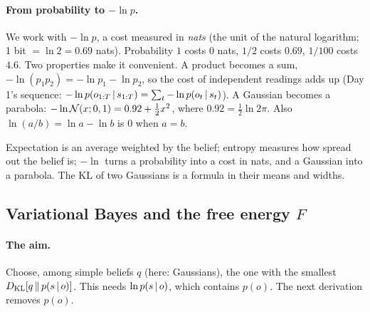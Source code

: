 \documentclass[11pt]{article}
\begin{document}
\paragraph{From probability to $-\ln p$.} We work with $-\ln p$, a cost measured in \emph{nats} (the unit of the natural logarithm; 1 bit $= \ln 2 = 0.69$ nats). Probability $1$ costs $0$ nats, $1/2$ costs $0.69$, $1/100$ costs $4.6$. Two properties make it convenient. A product becomes a sum, $-\ln(p_1p_2) = -\ln p_1 - \ln p_2$, so the cost of independent readings adds up (Day 1's sequence: $-\ln p(o_{1:T}\,|\, s_{1:T}) = \sum_t -\ln p(o_t\,|\, s_t)$). A Gaussian becomes a parabola: $-\ln\mathcal{N}(x;0,1) = 0.92 + \tfrac12x^2$, where $0.92 = \tfrac12\ln 2\pi$. Also $\ln(a/b) = \ln a - \ln b$ is $0$ when $a = b$.

\begin{keyidea}
Expectation is an average weighted by the belief; entropy measures how spread out the belief is; $-\ln$ turns a probability into a cost in nats, and a Gaussian into a parabola. The KL of two Gaussians is a formula in their means and widths.
\end{keyidea}

\subsection{Variational Bayes and the free energy $F$}

\paragraph{The aim.} Choose, among simple beliefs $q$ (here: Gaussians), the one with the smallest $D_{\mathrm{KL}}\!\left[q\,\middle\|\,p(s\,|\, o)\right]$. This needs $\ln p(s\,|\, o)$, which contains $p(o)$. The next derivation removes $p(o)$.
\end{document}
